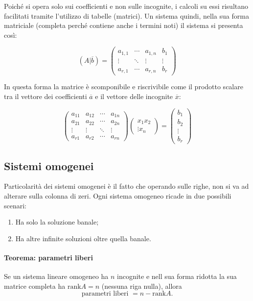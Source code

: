 \documentclass[x11names]{article}
\begin{document}
Poiché si opera solo sui coefficienti e non sulle incognite, i calcoli su essi risultano facilitati tramite l'utilizzo di tabelle (matrici). Un sistema quindi, nella sua forma matriciale (completa perché contiene anche i termini noti) il sistema si presenta così:

\[
\left(A|\overline{b}\right)=
\left(\begin{array}{ccc|c}
a_{1,1}&\cdots &a_{1,n}&b_{1} \\ \vdots &\ddots &\vdots  &\vdots \\ a_{r,1}&\cdots &a_{r,n}&b_{r}
\end{array}\right)
\] 

In questa forma la matrice è scomponibile e riscrivibile come il prodotto scalare tra il vettore dei coefficienti $\overline{a}$ e il vettore delle incognite $\overline{x}$:

\[
\begin{pmatrix}
a_{11}&a_{12}&\cdots &a_{1n}\\
a_{21}&a_{22}&\cdots &a_{2n}\\
\vdots &\vdots &\ddots &\vdots\\ 
a_{r1}&a_{r2}&\cdots &a_{rn}
\end{pmatrix}
\begin{pmatrix}x_{1}x_{2}\\
\vdots x_{n}
\end{pmatrix}=
\begin{pmatrix}
b_{1} \\
b_{2} \\
\vdots\\ 
b_{r}
\end{pmatrix}
\]

\subsection{Sistemi omogenei}
Particolarità dei sistemi omogenei è il fatto che operando sulle righe, non si va ad alterare sulla colonna di zeri. Ogni sistema omogeneo ricade in due possibili scenari:

\begin{enumerate}
 	\item Ha solo la soluzione banale;
	 \item Ha altre infinite soluzioni oltre quella banale.
\end{enumerate}


\begin{center}
\colorbox{Bisque1}{\begin{minipage}{5.75in}
\begin{yes}{}
\paragraph{Teorema: parametri liberi}
Se un sistema lineare omogeneo ha $n$ incognite e nell sua forma ridotta la sua matrice completa ha  $\text{rank}A = n$ (nessuna riga nulla), allora
\[
\text{parametri liberi } = n - \text{rank}A
.\] 
\end{yes}
\end{minipage}}        
\end{center}
\end{document}

